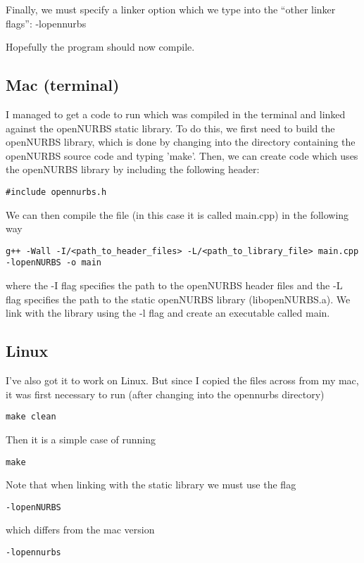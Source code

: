 \documentclass[a4paper, 10pt]{article}
\begin{document}
Finally, we must specify a linker option which we type into the ``other linker flags'': -lopennurbs

Hopefully the program should now compile.

\subsection*{Mac (terminal)}

I managed to get a code to run which was compiled in the terminal and linked against the openNURBS static library. To do this, we first need to build the openNURBS library, which is done by changing into the directory containing the openNURBS source code and typing 'make'. Then, we can create code which uses the openNURBS library by including the following header:
\begin{verbatim}
#include opennurbs.h
\end{verbatim}
We can then compile the file (in this case it is called main.cpp) in the following way
\begin{verbatim}
g++ -Wall -I/<path_to_header_files> -L/<path_to_library_file> main.cpp -lopenNURBS -o main
\end{verbatim}
where the -I flag specifies the path to the openNURBS header files and the -L flag specifies the path to the static openNURBS library (libopenNURBS.a). We link with the library using the -l flag and create an executable called main.

\subsection*{Linux}

I've also got it to work on Linux. But since I copied the files across from my mac, it was first necessary to run (after changing into the opennurbs directory)
\begin{Verbatim}
make clean
\end{Verbatim}
Then it is a simple case of running
\begin{Verbatim}
make
\end{Verbatim}

Note that when linking with the static library we must use the flag
\begin{Verbatim}
-lopenNURBS
\end{Verbatim}
which differs from the mac version 
\begin{Verbatim}
-lopennurbs
\end{Verbatim}
\end{document}
